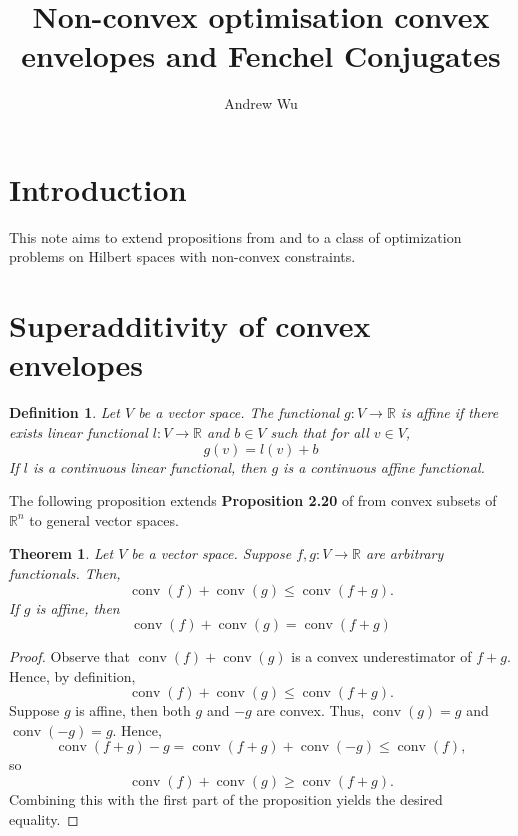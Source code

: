 \documentclass[11pt]{article}
\title{Non-convex optimisation convex envelopes and Fenchel Conjugates}
\author{Andrew Wu}
\newtheorem{definition}{Definition}
\newtheorem{theorem}{Theorem}
\DeclareMathOperator*{\conv}{conv}
\newcommand{\R}{\mathbb{R}}
\newcommand{\Prob}[1]{\mathscr{P}_{#1}}
\begin{document}
	
	\maketitle
	
	\section{Introduction}
	This note aims to extend propositions from \cite{Bauschke2010} and \cite{Tardella} to a class of optimization problems on Hilbert spaces with non-convex constraints.
	
	\begin{comment}
	\section{Problem}
	Let $X,Y$ be Hilbert spaces and suppose $f:X\times Y\to\R$ is a smooth convex function and  $g:X\times Y\to\R$ is non-convex. We want to solve the following problem, denoted by $\Prob{0}$
	\begin{equation*}
		\inf_{x,y\in X\times Y} f(x,y)
		\end{equation*}
	subject to the constraint 
	\[	g(x,y) \geq 0.
		\]
	\end{comment}
	\section{Superadditivity of convex envelopes}
	\begin{definition}
		Let $V$ be a vector space. The functional $g:V\to\R$ is affine if there exists linear functional $l:V\to\R$ and $b\in V$ such that for all $v\in V$, 
		\[  g(v) = l(v) + b
		\]
		If $l$ is a continuous linear functional, then $g$ is a continuous affine functional.
	\end{definition}
	\noindent The following proposition extends \textbf{Proposition 2.20} of \cite{Tardella} from convex subsets of $\R^{n}$ to general vector spaces.
	
	\begin{theorem}
		\label{prop:conv}
		Let $V$ be a vector space. Suppose $f,g:V\to\R$ are arbitrary functionals. Then, 
		\[  \conv(f) + \conv(g)\leq \conv(f+g).
		\]
		If $g$ is affine, then 
		\[  \conv(f) + \conv(g) = \conv(f + g)
		\]
	\end{theorem}
	
	
	\begin{proof}
		Observe that $\conv(f) + \conv(g)$ is a convex underestimator of $f + g$. Hence, by definition,
		\[  \conv(f) + \conv(g)\leq \conv(f+g).
		\]
		Suppose $g$ is affine, then both $g$ and $-g$ are convex. Thus, $\conv(g) = g$ and $\conv(-g)=g$. Hence,
		\[	\conv(f + g) - g = \conv(f+g) + \conv(-g) \leq \conv(f),
				\]
		so 
		\[	\conv(f) + \conv(g) \geq \conv(f + g).
				\]
		Combining this with the first part of the proposition yields the desired equality.
		\end{proof}
	
\end{document}

